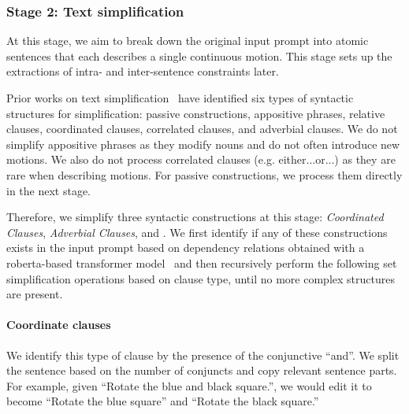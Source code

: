 \subsubsection{Stage 2: Text simplification}
At this stage, we aim to break down the original input prompt into
atomic sentences that each describes a single continuous motion.
This stage sets up the extractions of intra- and inter-sentence
constraints later. 

%
Prior works on text
simplification~\cite{zhang2019generating, ferres2016yats} have identified six types of syntactic structures for
simplification: passive constructions, appositive phrases, relative
clauses, coordinated clauses, correlated clauses, and adverbial
clauses. 
%
We do not simplify appositive phrases as they modify nouns and do
not often introduce new motions.
We also do not process correlated
clauses (e.g. either...or...) as they are rare when describing
motions.   For passive constructions, we process them directly in the
next stage. 

Therefore, we simplify three syntactic constructions at this stage:
\textit{Coordinated Clauses}, \textit{Adverbial Clauses}, and
.  We first identify if any of these
constructions exists in the input prompt based on dependency relations
obtained with a roberta-based transformer
model~\cite{liu2019roberta, honnibal2020spacy} and then recursively perform the
following set simplification operations based on clause type, until no
more complex structures are present.

\paragraph{Coordinate clauses} We identify this type of clause by the presence of the conjunctive ``and''. 
We split the sentence based on the number of conjuncts and copy relevant sentence parts. For example, given ``Rotate the blue and black square.'', we would edit it to become ``Rotate the blue square'' and ``Rotate the black square.''

